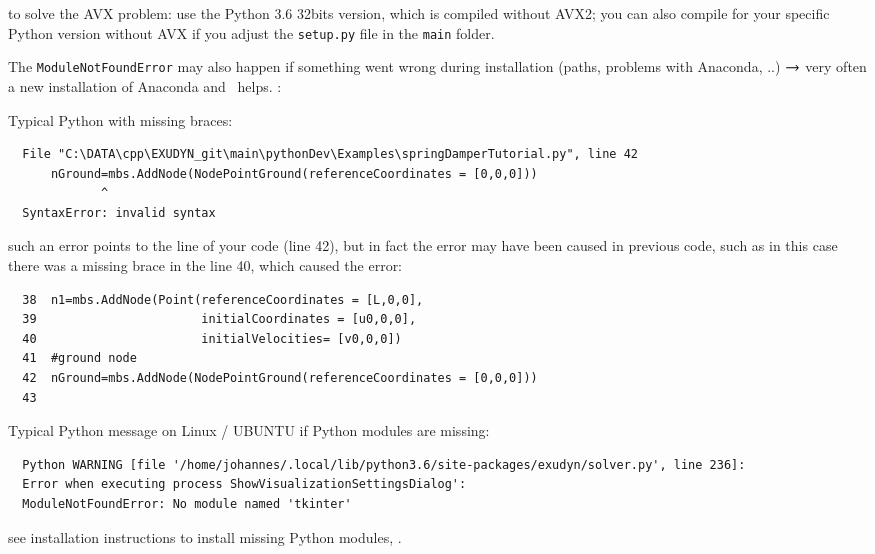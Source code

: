 \item[$\ra$]  to solve the AVX problem: use the Python 3.6 32bits version, which is compiled without AVX2; you can also compile for your specific Python version without AVX if you adjust the \texttt{setup.py} file in the \texttt{main} folder.
\item[$\ra$] The \texttt{ModuleNotFoundError} may also happen if something went wrong during installation (paths, problems with Anaconda, ..) $\ra$ very often a new installation of Anaconda and \codeName\ helps.
\ei
\ei
\noindent {}:
\bi
  \item Typical Python  with missing braces:
\plainlststyle
\begin{lstlisting}
  File "C:\DATA\cpp\EXUDYN_git\main\pythonDev\Examples\springDamperTutorial.py", line 42
      nGround=mbs.AddNode(NodePointGround(referenceCoordinates = [0,0,0]))
             ^
  SyntaxError: invalid syntax
\end{lstlisting}
%
\item[$\ra$] such an error points to the line of your code (line 42), but in fact the error may have been caused in previous code, such as in this case there was a missing brace in the line 40, which caused the error:
\pythonstyle\begin{lstlisting}
  38  n1=mbs.AddNode(Point(referenceCoordinates = [L,0,0], 
  39                       initialCoordinates = [u0,0,0], 
  40                       initialVelocities= [v0,0,0])	
  41  #ground node
  42  nGround=mbs.AddNode(NodePointGround(referenceCoordinates = [0,0,0]))
  43  
\end{lstlisting}
%
%
\item Typical Python  message on Linux / UBUNTU if Python modules are missing:
\plainlststyle
\begin{lstlisting}
  Python WARNING [file '/home/johannes/.local/lib/python3.6/site-packages/exudyn/solver.py', line 236]: 
  Error when executing process ShowVisualizationSettingsDialog':
  ModuleNotFoundError: No module named 'tkinter'
\end{lstlisting}
%
\item[$\ra$] see installation instructions to install missing Python modules, .
\ei 



